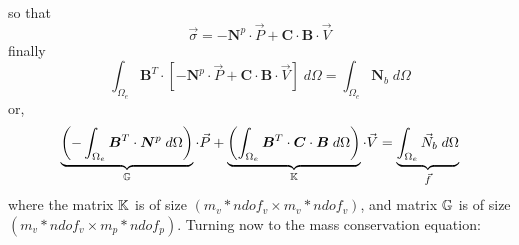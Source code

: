 so that
\begin{equation}
\vec{\sigma} 
= - {\bm N}^p
 \cdot {\vec P}  + 
{\bm C} \cdot  {\bm B}\cdot {\vec V}
\end{equation}
finally
\begin{equation}
\int_{\Omega_e} {\bm B}^T \cdot 
[
- {\bm N}^p  \cdot {\vec P}  + {\bm C} \cdot  {\bm B}\cdot {\vec V}
]
\; d\Omega
=
\int_{\Omega_e} {\bm N}_b \; d\Omega 
\end{equation}
or,
\begin{equation}
\underbrace{\left(-\int_{\Omega_e} {\bm B}^T \cdot 
{\bm N}^p  
\; d\Omega \right)}_{{\mathbb{G}}} \cdot {\vec P} 
+
\underbrace{
\left(
\int_{\Omega_e} {\bm B}^T \cdot 
{\bm C} \cdot  {\bm B}
\; d\Omega
\right)}_{{\mathbb{K}}}
\cdot {\vec V}
=
\underbrace{\int_{\Omega_e} {\vec N}_b \; d\Omega }_{\vec f}
\end{equation}
where the matrix ${\mathbb{K}}$ is of size $(m_v*ndof_v \times m_v*ndof_v)$, 
and matrix ${{\mathbb{G}}}$ is of size $(m_v*ndof_v \times m_p*ndof_p)$.
Turning now to the mass conservation equation:
